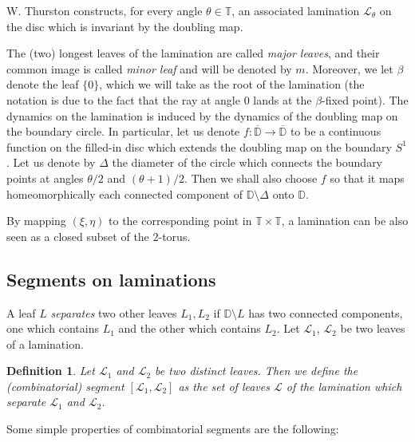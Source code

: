 \documentclass[11pt]{amsart}
\newtheorem{definition}[theorem]{Definition}
\begin{document}
W. Thurston \cite{Th} constructs, for every angle $\theta \in \mathbb{T}$, an associated lamination $\mathcal{L}_\theta$ on the disc which is invariant by the doubling map.


\medskip
The (two) longest leaves of the lamination are called \emph{major leaves}, and their common image is called \emph{minor leaf} 
and will be denoted by $m$. Moreover, we let $\beta$ denote the leaf $\{0 \}$, which we will take as the root of the lamination (the notation is due to the fact 
that the ray at angle $0$ lands at the $\beta$-fixed point). The dynamics on the lamination is induced by the dynamics of the doubling map 
on the boundary circle. In particular, let us denote $f : \overline{\mathbb{D}} \to \overline{\mathbb{D}}$ to be a continuous function 
on the filled-in disc which extends the doubling map on the boundary $S^1$. Let us denote by $\Delta$ the diameter of the circle which 
connects the boundary points at angles $\theta/2$ and $(\theta+1)/2$. Then we shall also choose $f$ so that it maps homeomorphically 
each connected component of $\mathbb{D}\setminus \Delta$ onto $\mathbb{D}$.

By mapping $(\xi, \eta)$ to the corresponding point in $\mathbb{T} \times \mathbb{T}$, a lamination can be also seen 
as a closed subset of the $2$-torus. 



\subsection{Segments on laminations} 


A leaf $L$ \emph{separates} two other leaves $L_1, L_2$ if $\mathbb{D} \setminus L$ has two connected components, 
one which contains $L_1$ and the other which contains $L_2$.
Let $\mathcal{L}_1$, $\mathcal{L}_2$ be two leaves of a lamination. 


\begin{definition}
Let $\mathcal{L}_1$ and $\mathcal{L}_2$ be two distinct leaves. Then we define the \emph{(combinatorial) segment} $[\mathcal{L}_1, \mathcal{L}_2]$
as the set of leaves $\mathcal{L}$ of the lamination which separate $\mathcal{L}_1$ and $\mathcal{L}_2$. 
\end{definition}

Some simple properties of combinatorial segments are the following: 
\end{document}
